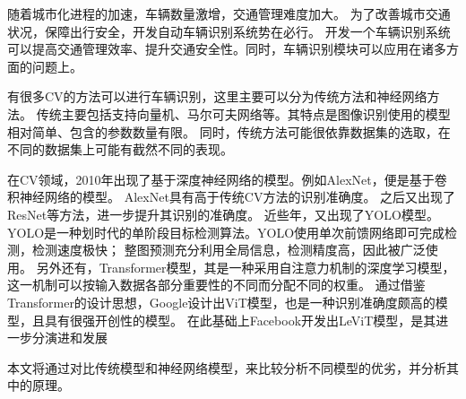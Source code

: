 随着城市化进程的加速，车辆数量激增，交通管理难度加大。
为了改善城市交通状况，保障出行安全，开发自动车辆识别系统势在必行。
开发一个车辆识别系统可以提高交通管理效率、提升交通安全性。同时，车辆识别模块可以应用在诸多方面的问题上。 \par

有很多CV的方法可以进行车辆识别，这里主要可以分为传统方法和神经网络方法。
传统主要包括支持向量机、马尔可夫网络等。其特点是图像识别使用的模型相对简单、包含的参数数量有限。
同时，传统方法可能很依靠数据集的选取，在不同的数据集上可能有截然不同的表现。 \par

在CV领域，2010年出现了基于深度神经网络的模型。例如AlexNet，便是基于卷积神经网络的模型。
AlexNet具有高于传统CV方法的识别准确度\cite{AlexNet}。
之后又出现了ResNet\cite{ResNet}等方法，进一步提升其识别的准确度。
近些年，又出现了YOLO模型。
YOLO是一种划时代的单阶段目标检测算法。YOLO使用单次前馈网络即可完成检测，检测速度极快；
整图预测充分利用全局信息，检测精度高，因此被广泛使用\cite{YOLO}。
另外还有，Transformer模型，其是一种采用自注意力机制的深度学习模型，这一机制可以按输入数据各部分重要性的不同而分配不同的权重。
通过借鉴Transformer的设计思想，Google设计出ViT模型，也是一种识别准确度颇高的模型，且具有很强开创性的模型\cite{Vision_Transformers}。
在此基础上Facebook开发出LeViT模型，是其进一步分演进和发展\cite{LeViT} \par

本文将通过对比传统模型和神经网络模型，来比较分析不同模型的优劣，并分析其中的原理。